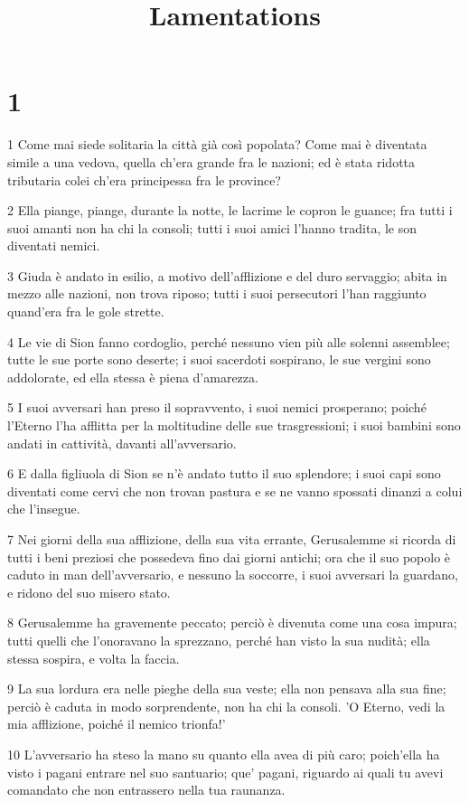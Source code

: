 

\title{Lamentations}


\chapter{1}

\par 1 Come mai siede solitaria la città già così popolata? Come mai è diventata simile a una vedova, quella ch'era grande fra le nazioni; ed è stata ridotta tributaria colei ch'era principessa fra le province?
\par 2 Ella piange, piange, durante la notte, le lacrime le copron le guance; fra tutti i suoi amanti non ha chi la consoli; tutti i suoi amici l'hanno tradita, le son diventati nemici.
\par 3 Giuda è andato in esilio, a motivo dell'afflizione e del duro servaggio; abita in mezzo alle nazioni, non trova riposo; tutti i suoi persecutori l'han raggiunto quand'era fra le gole strette.
\par 4 Le vie di Sion fanno cordoglio, perché nessuno vien più alle solenni assemblee; tutte le sue porte sono deserte; i suoi sacerdoti sospirano, le sue vergini sono addolorate, ed ella stessa è piena d'amarezza.
\par 5 I suoi avversari han preso il sopravvento, i suoi nemici prosperano; poiché l'Eterno l'ha afflitta per la moltitudine delle sue trasgressioni; i suoi bambini sono andati in cattività, davanti all'avversario.
\par 6 E dalla figliuola di Sion se n'è andato tutto il suo splendore; i suoi capi sono diventati come cervi che non trovan pastura e se ne vanno spossati dinanzi a colui che l'insegue.
\par 7 Nei giorni della sua afflizione, della sua vita errante, Gerusalemme si ricorda di tutti i beni preziosi che possedeva fino dai giorni antichi; ora che il suo popolo è caduto in man dell'avversario, e nessuno la soccorre, i suoi avversari la guardano, e ridono del suo misero stato.
\par 8 Gerusalemme ha gravemente peccato; perciò è divenuta come una cosa impura; tutti quelli che l'onoravano la sprezzano, perché han visto la sua nudità; ella stessa sospira, e volta la faccia.
\par 9 La sua lordura era nelle pieghe della sua veste; ella non pensava alla sua fine; perciò è caduta in modo sorprendente, non ha chi la consoli. 'O Eterno, vedi la mia afflizione, poiché il nemico trionfa!'
\par 10 L'avversario ha steso la mano su quanto ella avea di più caro; poich'ella ha visto i pagani entrare nel suo santuario; que' pagani, riguardo ai quali tu avevi comandato che non entrassero nella tua raunanza.
